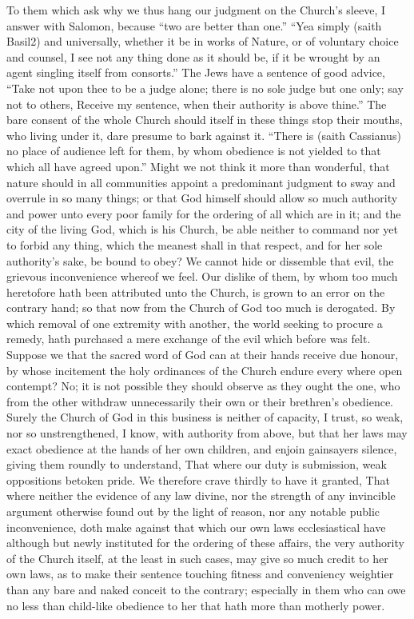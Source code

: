 To them which ask why we thus hang our judgment on the Church’s sleeve, I answer with Salomon, because “two are better than one.” “Yea simply (saith Basil2) and universally, whether it be in works of Nature, or of voluntary choice and counsel, I see not any thing done as it should be, if it be wrought by an agent singling itself from consorts.” The Jews have a sentence of good advice, “Take not upon thee to be a judge alone; there is no sole judge but one only; say not to others, Receive my sentence, when their authority is above thine.” The bare consent of the whole Church should itself in these things stop their mouths,  who living under it, dare presume to bark against it. “There is (saith Cassianus) no place of audience left for them, by whom obedience is not yielded to that which all have agreed upon.” Might we not think it more than wonderful, that nature should in all communities appoint a predominant judgment to sway and overrule in so many things; or that God himself should allow so much authority and power unto every poor family for the ordering of all which are in it; and the city of the living God, which is his Church, be able neither to command nor yet to forbid any thing, which the meanest shall in that respect, and for her sole authority’s sake, be bound to obey?
We cannot hide or dissemble that evil, the grievous inconvenience whereof we feel. Our dislike of them, by whom too much heretofore hath been attributed unto the Church, is grown to an error on the contrary hand; so that now from the Church of God too much is derogated. By which removal of one extremity with another, the world seeking to procure a remedy, hath purchased a mere exchange of the evil which before was felt.
Suppose we that the sacred word of God can at their hands receive due honour, by whose incitement the holy ordinances of the Church endure every where open contempt? No; it is not possible they should observe as they ought the one, who from the other withdraw unnecessarily their own or their brethren’s obedience.
Surely the Church of God in this business is neither of capacity, I trust, so weak, nor so unstrengthened, I know, with authority from above, but that her laws may exact obedience at the hands of her own children, and enjoin gainsayers silence, giving them roundly to understand, That where our duty is submission, weak oppositions betoken pride.
We therefore crave thirdly to have it granted, That where neither the evidence of any law divine, nor the strength of any invincible argument otherwise found out by the light of reason, nor any notable public inconvenience, doth make  against that which our own laws ecclesiastical have although but newly instituted for the ordering of these affairs, the very authority of the Church itself, at the least in such cases, may give so much credit to her own laws, as to make their sentence touching fitness and conveniency weightier than any bare and naked conceit to the contrary; especially in them who can owe no less than child-like obedience to her that hath more than motherly power.

